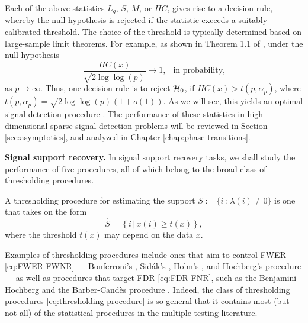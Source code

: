 Each of the above statistics $L_q$, $S$, $M$, or $HC$, gives rise to a decision rule, whereby the null hypothesis is rejected if 
the statistic exceeds a suitably calibrated threshold. The choice of the threshold is typically determined based on large-sample limit 
theorems. For example, as shown in Theorem 1.1 of \cite{donoho2004higher}, under the null hypothesis
$$
 \frac{HC(x)}{\sqrt{2\log\log(p)}} \longrightarrow  1,\ \ \mbox{ in probability,}
$$ 
as $p\to\infty$.  Thus, one decision rule is to reject ${\cal H}_0$, if $HC(x)> t(p,\alpha_p)$, where 
$t(p,\alpha_p) = \sqrt{2\log\log(p)}(1+o(1))$.  As we will see, this yields an optimal signal detection procedure 
\citep[see also Theorem 1.2 in ][]{donoho2004higher}. The performance of these statistics in high-dimensional 
sparse signal detection problems will be reviewed in Section \ref{sec:asymptotics}, and analyzed in Chapter \ref{chap:phase-transitions}.

\medskip

{\bf Signal support recovery.}
In signal support recovery tasks, we shall study the performance of five procedures, all of which belong to the broad class of thresholding procedures.
\begin{definition}
A thresholding procedure for estimating the support 
$S:=\{i\, :\, \lambda(i)\neq0\}$ is one that takes on the form
\begin{equation} \label{eq:thresholding-procedure}
    \widehat{S} = \left\{i\,|\,x(i) \ge t(x)\right\},
\end{equation}
where the threshold $t(x)$ may depend on the data $x$.
\end{definition}

Examples of thresholding procedures include ones that aim to control FWER \eqref{eq:FWER-FWNR} --- Bonferroni's \citep{dunn1961multiple}, Sid\'ak's \citep{vsidak1967rectangular}, Holm's \citep{holm1979simple}, and Hochberg's procedure \citep{hochberg1988sharper} --- as well as procedures that target FDR \eqref{eq:FDR-FNR}, such as the Benjamini-Hochberg \cite{benjamini1995controlling} and the Barber-Cand\`es procedure \citep{barber2015controlling}.
Indeed, the class of thresholding procedures \eqref{eq:thresholding-procedure} is so general that it contains most (but not all) of the statistical procedures in the multiple testing literature.



